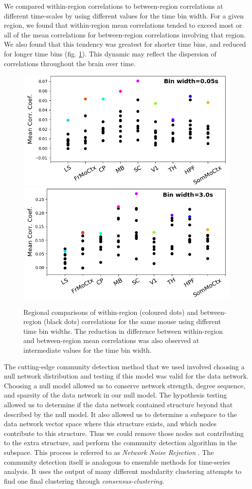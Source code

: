 \documentclass[a4paper,12pt]{article}
\theoremstyle{definition}
\begin{document}
We compared within-region correlations to between-region correlations at different time-scales by using different values for the time bin width. For a given region, we found that within-region mean correlations tended to exceed most or all of the mean correlations for between-region correlations involving that region. We also found that this tendency was greatest for shorter time bins, and reduced for longer time bins (fig. \ref{fig:within_between}). This dynamic may reflect the dispersion of correlations throughout the brain over time.

\begin{figure}[t!]
    \centering
    \includegraphics[width=0.45\columnwidth]{images/Krebs_0p05_corr_comp.png}
    \includegraphics[width=0.45\columnwidth]{images/Krebs_3p0_corr_comp.png}
    \vspace{-0.4cm}
    \caption{Regional comparisons of within-region (coloured dots) and between-region (black dots) correlations for the same mouse using different time bin widths. The reduction in difference between within-region and between-region mean correlations was also observed at intermediate values for the time bin width.}
    \vspace{-0.1cm}
    \label{fig:within_between}
\end{figure}


The cutting-edge community detection method that we used involved choosing a null network distribution and testing if this model was valid for the data network. Choosing a null model allowed us to conserve network strength, degree sequence, and sparsity of the data network in our null model. The hypothesis testing allowed us to determine if the data network contained structure beyond that described by the null model. It also allowed us to determine a subspace to the data network vector space where this structure exists, and which nodes contribute to this structure. Thus we could remove those nodes not contributing to the extra structure, and perform the community detection algorithm in the subspace. This process is referred to as \textit{Network Noise Rejection} \cite{humphries}. The community detection itself is analogous to ensemble methods for time-series analysis. It uses the output of many different modularity clustering attempts to find one final clustering through \textit{consensus-clustering}.
\end{document}
